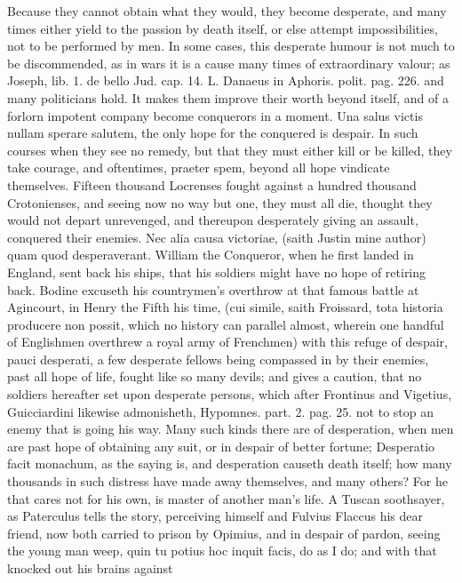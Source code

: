 {Because they cannot obtain what they would, they become desperate, and
many times either yield to the passion by death itself, or else attempt
impossibilities, not to be performed by men. In some cases, this
desperate humour is not much to be discommended, as in wars it is a
cause many times of extraordinary valour; as Joseph, lib. 1. de bello
Jud. cap. 14. L. Danaeus in Aphoris. polit. pag. 226. and many
politicians hold. It makes them improve their worth beyond itself, and
of a forlorn impotent company become conquerors in a moment. Una salus
victis nullam sperare salutem, the only hope for the conquered is
despair. In such courses when they see no remedy, but that they must
either kill or be killed, they take courage, and oftentimes, praeter
spem, beyond all hope vindicate themselves. Fifteen thousand Locrenses
fought against a hundred thousand Crotonienses, and seeing now no way
but one, they must all die, thought they would not depart
unrevenged, and thereupon desperately giving an assault, conquered
their enemies. Nec alia causa victoriae, (saith Justin mine author)
quam quod desperaverant. William the Conqueror, when he first landed in
England, sent back his ships, that his soldiers might have no hope of
retiring back. Bodine excuseth his countrymen's overthrow at that
famous battle at Agincourt, in Henry the Fifth his time, (cui simile,
saith Froissard, tota historia producere non possit, which no history
can parallel almost, wherein one handful of Englishmen overthrew a
royal army of Frenchmen) with this refuge of despair, pauci desperati,
a few desperate fellows being compassed in by their enemies, past all
hope of life, fought like so many devils; and gives a caution, that no
soldiers hereafter set upon desperate persons, which after
Frontinus and Vigetius, Guicciardini likewise admonisheth, Hypomnes.
part. 2. pag. 25. not to stop an enemy that is going his way. Many such
kinds there are of desperation, when men are past hope of obtaining any
suit, or in despair of better fortune; Desperatio facit monachum, as
the saying is, and desperation causeth death itself; how many thousands
in such distress have made away themselves, and many others? For he
that cares not for his own, is master of another man's life. A Tuscan
soothsayer, as Paterculus tells the story, perceiving himself and
Fulvius Flaccus his dear friend, now both carried to prison by Opimius,
and in despair of pardon, seeing the young man weep, quin tu potius hoc
inquit facis, do as I do; and with that knocked out his brains against
}
